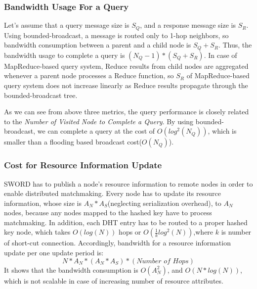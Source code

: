 \documentclass{acm_proc_article-sp}
\begin{document}
\subsubsection{Bandwidth Usage For a Query}
Let's assume that a query message size is $S_Q$, and a response message size is $S_R$.
Using bounded-broadcast, a message is routed only to 1-hop neighbors, so bandwidth consumption between a parent and a child node is $S_Q+S_R$.
Thus, the bandwidth usage to complete a query is \begin{math}(N_Q-1)*(S_Q+S_R)\end{math}.
In case of MapReduce-based query system, Reduce results from child nodes are aggregated whenever a parent node processes a Reduce function, so $S_R$ of MapReduce-based query system does not increase linearly
as Reduce results propagate through the bounded-broadcast tree.

As we can see from above three metrics, the query performance is closely related to the \textit{Number of Visited Node to Complete a Query}. By using bounded-broadcast, we can complete a query
at the cost of \begin{math}O(log^2(N_Q))\end{math}, which is smaller than a flooding based broadcast cost(\begin{math}O(N_Q)\end{math}).
\subsubsection{Cost for Resource Information Update}
SWORD has to publish a node's resource information to remote nodes in order to enable distributed matchmaking.
Every node has to update its resource information, whose size is $A_N*A_S$(neglecting serialization overhead), to $A_N$ nodes, because any nodes mapped to the hashed key have to process matchmaking. 
In addition, each DHT entry has to be routed to a proper hashed key node, which takes $O(log(N))$ hops\cite{chord}\cite{pastry} or \begin{math}O(\frac{1}{k}log^2(N))\end{math},where $k$ is number of short-cut connection\cite{brunet}.
Accordingly, bandwidth for a resource information update per one update period is:
\begin{displaymath}N*A_N*(A_N*A_S)*(\textit{Number of Hops})\end{displaymath}
It shows that the bandwidth consumption is $O(A_N^2)$, and $O(N*log(N))$, which is not scalable in case of increasing number of resource attributes.
\end{document}
